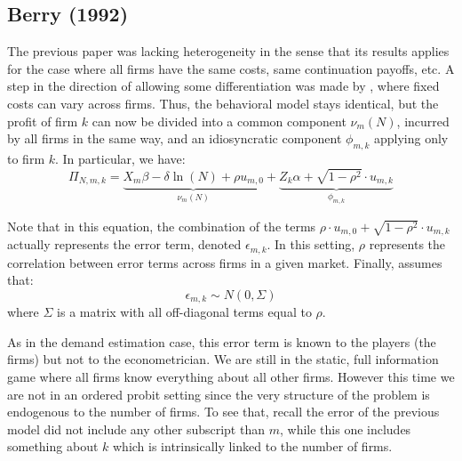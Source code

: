 \documentclass[12pt]{report}
\begin{document}
\subsection{Berry (1992)}

The previous paper was lacking heterogeneity in the sense that its results applies for the case where all firms have the same costs, same continuation payoffs, etc. A step in the direction of allowing some differentiation was made by \cite{berry_92}, where fixed costs can vary across firms. Thus, the behavioral model stays identical, but the profit of firm $k$ can now be divided into a common component $\nu_m(N)$, incurred by all firms in the same way, and an idiosyncratic component $\phi_{m,k}$ applying only to firm $k$. In particular, we have: $$ \Pi_{N,m,k} = \underbrace{X_m\beta - \delta\ln(N) + \rho u_{m,0}}_{\nu_m(N)} + \underbrace{Z_k\alpha + \sqrt{1 - \rho^2}\cdot u_{m,k}}_{\phi_{m,k}} $$ 

Note that in this equation, the combination of the terms $\rho \cdot u_{m,0} + \sqrt{1 - \rho^2}\cdot u_{m,k} $ actually represents the error term, denoted $\epsilon_{m,k}$. In this setting, $\rho$ represents the correlation between error terms across firms in a given market. Finally, \cite{berry_92} assumes that: $$\epsilon_{m,k} \sim N(0, \Sigma) $$ where $\Sigma$ is a matrix with all off-diagonal terms equal to $\rho$.

As in the demand estimation case, this error term is known to the players (the firms) but not to the econometrician. We are still in the static, full information game where all firms know everything about all other firms. However this time we are not in an ordered probit setting since the very structure of the problem is endogenous to the number of firms. To see that, recall the error of the previous model did not include any other subscript than $m$, while this one includes something about $k$ which is intrinsically linked to the number of firms.
\end{document}
